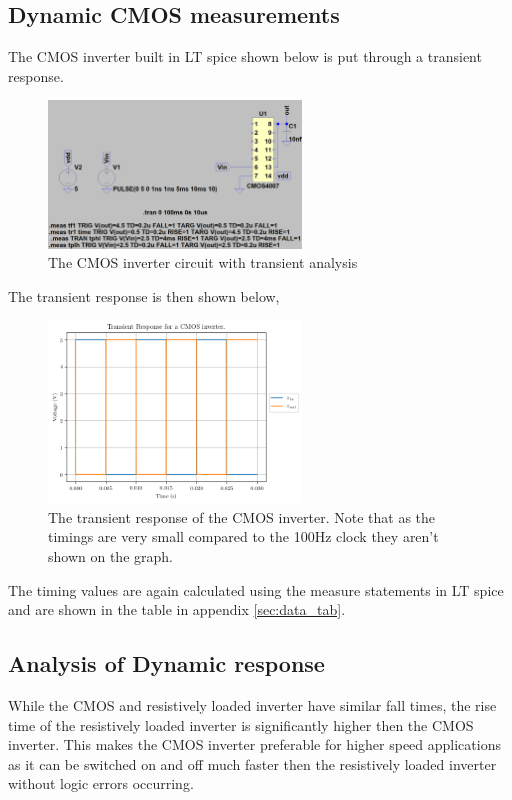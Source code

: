 \documentclass[titlepage, 12pt]{article}
\begin{document}
    \subsection{Dynamic CMOS measurements}
    The CMOS inverter built in LT spice shown below is put through a
    transient response.
    \begin{figure}[H]
        \centering
        \includegraphics[width=0.6\textwidth]{figures/part_3b_circ.png}
        \caption{The CMOS inverter circuit with transient analysis}
    \end{figure}
    The transient response is then shown below,
    \begin{figure}[H]
        \centering
        \includegraphics[width=0.6\textwidth]{figures/part_3b.png}
        \caption{The transient response of the CMOS inverter. Note that
            as the timings are very small compared to the 100Hz clock
        they aren't shown on the graph.}
    \end{figure}
    The timing values are again calculated using the measure statements
    in LT spice and are shown in the table in appendix
    \ref{sec:data_tab}.

    \subsection{Analysis of Dynamic response}
    While the CMOS and resistively loaded inverter have similar fall
    times, the rise time of the resistively loaded inverter is
    significantly higher then the CMOS inverter. This makes the CMOS
    inverter preferable for higher speed applications as it can be
    switched on and off much faster then the resistively loaded inverter
    without logic errors occurring.
\end{document}
